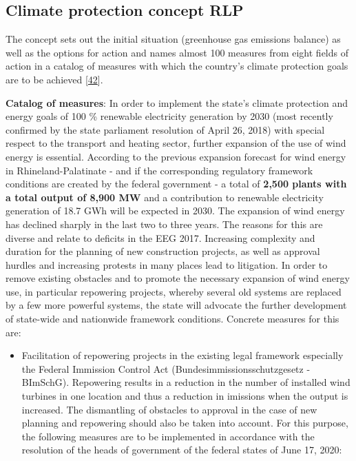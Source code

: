 \documentclass[a4paper,11pt]{article}
\providecommand{\tightlist}{%
  \setlength{\itemsep}{0pt}\setlength{\parskip}{0pt}}
\begin{document}
\hypertarget{climate-protection-concept-rlp}{%
\subsection{Climate protection concept RLP}\label{climate-protection-concept-rlp}}

The concept sets out the initial situation (greenhouse gas emissions balance) as well as the options for action and names almost 100 measures from eight fields of action in a catalog of measures with which the country's climate protection goals are to be achieved {[}\protect\hyperlink{ref-MinisteriumfurUmweltEnergieErnahrungundForsten.2020b}{42}{]}.

\textbf{Catalog of measures}: In order to implement the state's climate protection and energy goals of 100 \% renewable electricity generation by 2030 (most recently confirmed by the state parliament resolution of April 26, 2018) with special respect to the transport and heating sector, further expansion of the use of wind energy is essential. According to the previous expansion forecast for wind energy in Rhineland-Palatinate - and if the corresponding regulatory framework conditions are created by the federal government - a total of \textbf{2,500 plants with a total output of 8,900 MW} and a contribution to renewable electricity generation of 18.7 GWh will be expected in 2030. The expansion of wind energy has declined sharply in the last two to three years. The reasons for this are diverse and relate to deficits in the EEG 2017. Increasing complexity and duration for the planning of new construction projects, as well as approval hurdles and increasing protests in many places lead to litigation. In order to remove existing obstacles and to promote the necessary expansion of wind energy use, in particular repowering projects, whereby several old systems are replaced by a few more powerful systems, the state will advocate the further development of state-wide and nationwide framework conditions. Concrete measures for this are:
\begin{itemize}
\tightlist
\item
  Facilitation of repowering projects in the existing legal framework especially the Federal Immission Control Act (Bundesimmissionsschutzgesetz - BImSchG). Repowering results in a reduction in the number of installed wind turbines in one location and thus a reduction in imissions when the output is increased. The dismantling of obstacles to approval in the case of new planning and repowering should also be taken into account.
  For this purpose, the following measures are to be implemented in accordance with the resolution of the heads of government of the federal states of June 17, 2020:
\end{itemize}
\end{document}
